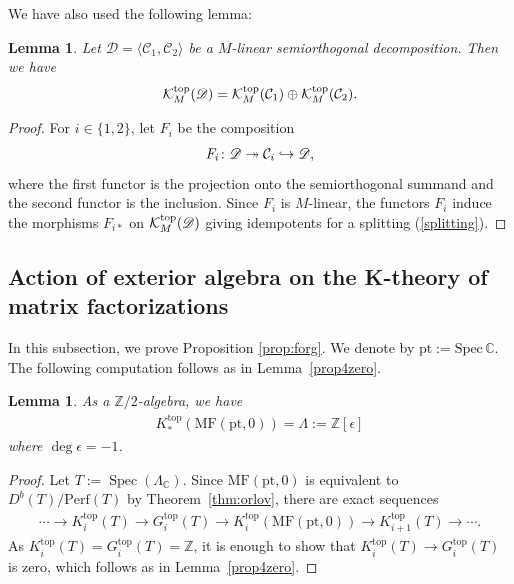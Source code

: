 \documentclass [11pt,oneside,a4paper,mathscr]{amsart}
\newtheorem{lemma}[thm]{Lemma}
\theoremstyle{definition}
\newcommand{\Spec}{\operatorname{Spec}}
\begin{document}
We have also used the following lemma: 

\begin{lemma}\label{lem:sod:Ktheory}
Let $\mathscr{D}=\langle \mathcal{C}_1, \mathcal{C}_2\rangle$
be a $M$-linear semiorthogonal decomposition. 
Then we have 
\begin{align}\label{splitting}
    \mathcal{K}_M^{\rm{top}}(\mathscr{D}) =\mathcal{K}_M^{\rm{top}}(\mathcal{C}_1) \oplus \mathcal{K}_M^{\rm{top}}(\mathcal{C}_2).
\end{align}  
\end{lemma}
\begin{proof}
    For $i\in\{1,2\}$, let $F_i$ be the composition 
    \begin{align}\notag
        F_i \colon \mathscr{D} \twoheadrightarrow \mathcal{C}_i \hookrightarrow \mathscr{D},
        \end{align}
        where the first functor is the projection onto the semiorthogonal 
        summand and the second functor is the inclusion. 
        Since $F_i$ is $M$-linear, the functors $F_i$ induce 
        the morphisms $F_{i\ast}$ on $\mathcal{K}_M^{\rm{top}}(\mathscr{D})$ giving 
        idempotents for a splitting (\ref{splitting}). 
\end{proof}


\subsection{Action of exterior algebra on the K-theory of matrix factorizations}\label{subsec:exterior}
In this subsection, we prove Proposition \ref{prop:forg}.
We denote by $\mathrm{pt}:=\mathrm{Spec}\,\mathbb{C}$.
The following computation follows as in Lemma~\ref{prop4zero}. 

\begin{lemma}\label{lemmalambda}
As a $\mathbb{Z}/2$-algebra, we have
\begin{align*}
    K_{\ast}^{\mathrm{top}}(\mathrm{MF}(\mathrm{pt}, 0))
    =\Lambda :=\mathbb{Z}[\epsilon]
\end{align*}
where $\deg \epsilon=-1$. 
\end{lemma}
\begin{proof}
    Let $T:=\Spec \left(\Lambda_{\mathbb{C}}\right)$. 
    Since $\mathrm{MF}(\mathrm{pt}, 0)$ is equivalent to $D^b(T)/\mathrm{Perf}(T)$
    by Theorem~\ref{thm:orlov}, 
    there are exact sequences
    \begin{align*}
      \cdots \to
      K_i^{\mathrm{top}}(T) \to G_i^{\mathrm{top}}(T) \to K_i^{\mathrm{top}}(\mathrm{MF}(\mathrm{pt}, 0)) \to K_{i+1}^{\mathrm{top}}(T) \to \cdots.  
    \end{align*}
    As $K_i^{\mathrm{top}}(T)=G_i^{\mathrm{top}}(T)=\mathbb{Z}$, it is enough to show that 
    $K_i^{\mathrm{top}}(T) \to G_i^{\mathrm{top}}(T)$ is zero, which follows as in Lemma~\ref{prop4zero}. 
\end{proof}
\end{document}
